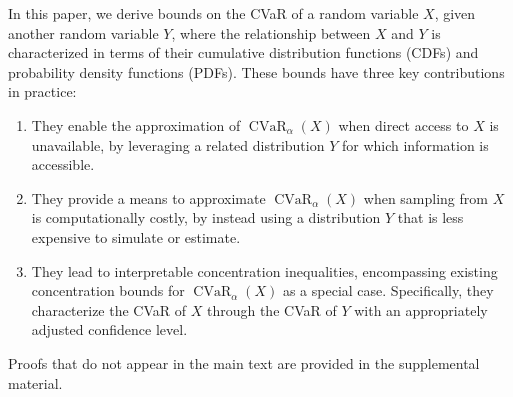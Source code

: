 \documentclass[letterpaper]{article} %
\begin{document}
In this paper, we derive bounds on the CVaR of a random variable $X$, given another random variable $Y$, where the relationship between $X$ and $Y$ is characterized in terms of their cumulative distribution functions (CDFs) and probability density functions (PDFs). These bounds have three key contributions in practice:
\begin{enumerate}
	\item They enable the approximation of $\operatorname{CVaR}_\alpha(X)$ when direct access to $X$ is unavailable, by leveraging a related distribution $Y$ for which information is accessible.
	\item They provide a means to approximate $\operatorname{CVaR}_\alpha(X)$ when sampling from $X$ is computationally costly, by instead using a distribution $Y$ that is less expensive to simulate or estimate.
	\item They lead to interpretable concentration inequalities, encompassing existing concentration bounds for $\operatorname{CVaR}_\alpha(X)$ as a special case. Specifically, they characterize the CVaR of $X$ through the CVaR of $Y$ with an appropriately adjusted confidence level.
\end{enumerate}
Proofs that do not appear in the main text are provided in the supplemental material.
\end{document}
